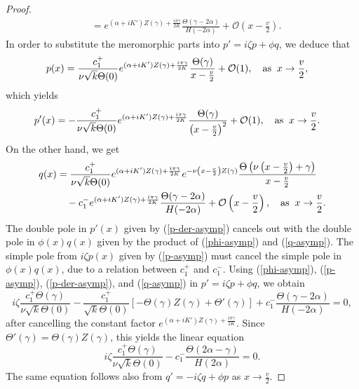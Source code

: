 \documentclass[12pt,reqno]{amsart}
\numberwithin{equation}{section}
\begin{document}
\begin{proof}
\begin{align*}
&= e^{(\alpha + iK') Z(\gamma) + \frac{i \pi \gamma}{2K}} \frac{\Theta(\gamma - 2 \alpha)}{H(-2\alpha)} + \mathcal{O}\left(x - \frac{v}{2}\right).
\end{align*}
In order to substitute the meromorphic parts into $p' = i \zeta p + \phi q$, 
we deduce that 
\begin{align}
p(x) &=  \frac{c_1^+ }{ \nu \sqrt{k} \Theta(0)} 
e^{(\alpha + iK') Z(\gamma) + \frac{i \pi \gamma}{2K}} 
\frac{\Theta(\gamma)}{x - \frac{v}{2}} + \mathcal{O}(1), 
\quad \mbox{\rm as} \;\; x \to \frac{v}{2},
\label{p-asymp}
\end{align}
which yields
\begin{align}
p'(x) &= -\frac{c_1^+ }{ \nu \sqrt{k} \Theta(0)} 
e^{(\alpha + iK') Z(\gamma) + \frac{i \pi \gamma}{2K}} 
\frac{\Theta(\gamma)}{\left( x - \frac{v}{2} \right)^2} 
+ \mathcal{O}(1), 
\quad \mbox{\rm as} \;\; x \to \frac{v}{2}.
\label{p-der-asymp}
\end{align}
On the other hand, we get 
\begin{align}
q(x) &= \frac{c_1^+ }{\nu \sqrt{k}\Theta(0)} 
e^{(\alpha + iK') Z(\gamma) + \frac{i \pi \gamma}{2K}} e^{-\nu \left(x - \frac{v}{2} \right) Z(\gamma)}
\frac{\Theta\left(\nu\left(x - \frac{v}{2}\right) + \gamma \right)}{x - \frac{v}{2}} \notag \\
& \quad - c_1^- e^{(\alpha + iK') Z(\gamma) + \frac{i \pi \gamma}{2K}} \frac{\Theta(\gamma - 2 \alpha)}{H(-2\alpha)} 
+ \mathcal{O}\left(x - \frac{v}{2}\right),
\quad \mbox{\rm as} \;\; x \to \frac{v}{2}.
\label{q-asymp}
\end{align}
The double pole in $p'(x)$ given by (\ref{p-der-asymp}) 
cancels out with the double pole in $\phi(x) q(x)$ given by 
the product of (\ref{phi-asymp}) and (\ref{q-asymp}). The simple pole 
from $i \zeta p(x)$ given by (\ref{p-asymp}) must cancel 
the simple pole in $\phi(x) q(x)$, due to a relation 
between $c_1^+$ and $c_1^-$. Using (\ref{phi-asymp}), (\ref{p-asymp}), (\ref{p-der-asymp}), and (\ref{q-asymp}) in $p' = i \zeta p + \phi q$, 
we obtain 
\begin{equation*}
i \zeta \frac{c_1^+ \Theta(\gamma)}{\nu \sqrt{k} \Theta(0)} -  \frac{c_1^+ }{\sqrt{k} \Theta(0)} \left[ - \Theta(\gamma) Z(\gamma) + \Theta'(\gamma) \right] + c_1^- \frac{\Theta(\gamma - 2 \alpha)}{H(-2\alpha)} = 0, 
\end{equation*}
after cancelling the constant factor $e^{(\alpha + iK') Z(\gamma) + \frac{i \pi \gamma}{2K}}$. Since $ \Theta'(\gamma) = \Theta(\gamma) Z(\gamma)$, this yields 
the linear equation 
\begin{equation}
\label{rel-c-1}
i \zeta  \frac{c_1^+ \Theta(\gamma)}{\nu \sqrt{k} \Theta(0)} 
- c_1^- \frac{\Theta(2 \alpha - \gamma)}{H(2\alpha)} = 0.
\end{equation}
The same equation follows also from $q' = -i\zeta q + \phi p$ as $x \to \frac{v}{2}$. 


\end{proof}
\end{document}
